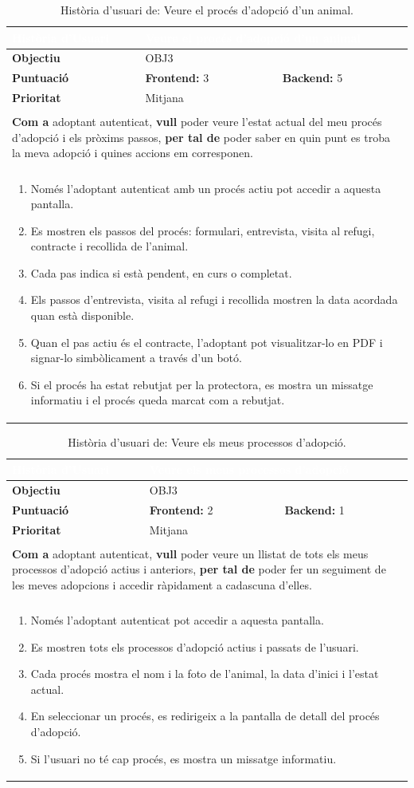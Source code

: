 \documentclass[11pt,a4paper]{report}
\newcommand{\HU}[9]{%
\begin{table}[H]\centering\footnotesize\renewcommand{\arraystretch}{1.1}%
\setlength{\extrarowheight}{0pt}%
\begin{tabular}{|l|p{4.8cm}|p{4.8cm}|}\hline
\rowcolor{oceanblue}\textcolor{white}{\textbf{Història d'Usuari}} & \multicolumn{2}{l|}{\textcolor{white}{#2}} \\\hline
\textbf{Objectiu} & \multicolumn{2}{l|}{#1} \\\hline
\rowcolor{gray!10}\textbf{Puntuació} & \textbf{Frontend: } #3 & \textbf{Backend: } #4 \\\hline
\textbf{Prioritat} & \multicolumn{2}{l|}{#5} \\\hline
\rowcolor{oceanblue}\multicolumn{3}{|l|}{\textcolor{white}{\textbf{Descripció}}} \\\hline
\multicolumn{3}{|p{12.5cm}|}{\textbf{Com a} #6, \textbf{vull} #7, \textbf{per tal de} #8.} \\\hline
\rowcolor{oceanblue}\multicolumn{3}{|l|}{\textcolor{white}{\textbf{Criteris d'Acceptació}}} \\\hline
\multicolumn{3}{|p{12.5cm}|}{\begin{enumerate}[leftmargin=0.4cm,topsep=0pt,parsep=0pt,itemsep=1pt,partopsep=0pt,after=\vspace{-3pt}] #9 \end{enumerate}} \\\hline
\end{tabular}\caption[HU: #2]{Història d'usuari de: #2.}\label{tab:hu_#1}\end{table}%
}
\begin{document}
    \HU{OBJ3}
    {Veure el procés d'adopció d'un animal}
    {3}
    {5}
    {Mitjana}
    {adoptant autenticat}
    {poder veure l'estat actual del meu procés d'adopció i els pròxims passos}
    {poder saber en quin punt es troba la meva adopció i quines accions em corresponen}
    {
        \item Només l'adoptant autenticat amb un procés actiu pot accedir a aquesta pantalla.
        \item Es mostren els passos del procés: formulari, entrevista, visita al refugi, contracte i recollida de l'animal.
        \item Cada pas indica si està pendent, en curs o completat.
        \item Els passos d'entrevista, visita al refugi i recollida mostren la data acordada quan està disponible.
        \item Quan el pas actiu és el contracte, l'adoptant pot visualitzar-lo en PDF i signar-lo simbòlicament a través d'un botó.
        \item Si el procés ha estat rebutjat per la protectora, es mostra un missatge informatiu i el procés queda marcat com a rebutjat.
    }
    \HU{OBJ3}
    {Veure els meus processos d'adopció}
    {2}
    {1}
    {Mitjana}
    {adoptant autenticat}
    {poder veure un llistat de tots els meus processos d'adopció actius i anteriors}
    {poder fer un seguiment de les meves adopcions i accedir ràpidament a cadascuna d'elles}
    {
        \item Només l'adoptant autenticat pot accedir a aquesta pantalla.
        \item Es mostren tots els processos d'adopció actius i passats de l'usuari.
        \item Cada procés mostra el nom i la foto de l'animal, la data d'inici i l'estat actual.
        \item En seleccionar un procés, es redirigeix a la pantalla de detall del procés d'adopció.
        \item Si l'usuari no té cap procés, es mostra un missatge informatiu.
    }
\end{document}
